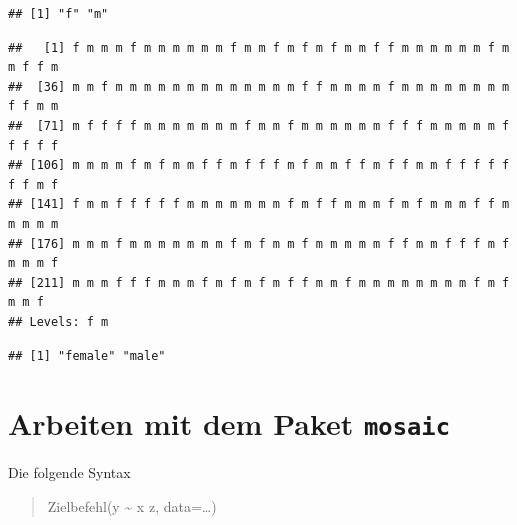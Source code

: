 \documentclass[10pt,ngerman,onside]{article}
\newenvironment{Shaded}{\begin{snugshade}}{\end{snugshade}}
\newcommand{\KeywordTok}[1]{\textcolor[rgb]{0.13,0.29,0.53}{\textbf{#1}}}
\newcommand{\DataTypeTok}[1]{\textcolor[rgb]{0.13,0.29,0.53}{#1}}
\newcommand{\StringTok}[1]{\textcolor[rgb]{0.31,0.60,0.02}{#1}}
\newcommand{\CommentTok}[1]{\textcolor[rgb]{0.56,0.35,0.01}{\textit{#1}}}
\newcommand{\OperatorTok}[1]{\textcolor[rgb]{0.81,0.36,0.00}{\textbf{#1}}}
\newcommand{\NormalTok}[1]{#1}
\begin{document}
\begin{verbatim}
## [1] "f" "m"
\end{verbatim}

\begin{Shaded}
\end{Shaded}

\begin{verbatim}
##   [1] f m m m f m m m m m m f m m f m f m f m m f f m m m m m m f m m f f m
##  [36] m m f m m m m m m m m m m m m m f f m m m m f m m m m m m m m f f m m
##  [71] m f f f f m m m m m m m f m m f m m m m m m f f f m m m m m f f f f f
## [106] m m m m f m f m m f f m f f f m f m m f f m f f m m f f f f f f f m f
## [141] f m m f f f f f m m m m m m m f m f f m m m f m f m m m f f m m m m m
## [176] m m m f m m m m m m m f m f m m f m m m m m f f m m f f f m f m m m f
## [211] m m m f f f m m m f m f m f m f f m m f m m m m m m m m f m f m m f
## Levels: f m
\end{verbatim}

\begin{Shaded}
\end{Shaded}

\begin{verbatim}
## [1] "female" "male"
\end{verbatim}

\hypertarget{arbeiten-mit-dem-paket-mosaic}{%
\section{\texorpdfstring{Arbeiten mit dem Paket
\texttt{mosaic}}{Arbeiten mit dem Paket mosaic}}\label{arbeiten-mit-dem-paket-mosaic}}

Die folgende Syntax

\begin{quote}
Zielbefehl(y \textasciitilde{} x \textbar{} z, data=\ldots{})
\end{quote}
\end{document}
